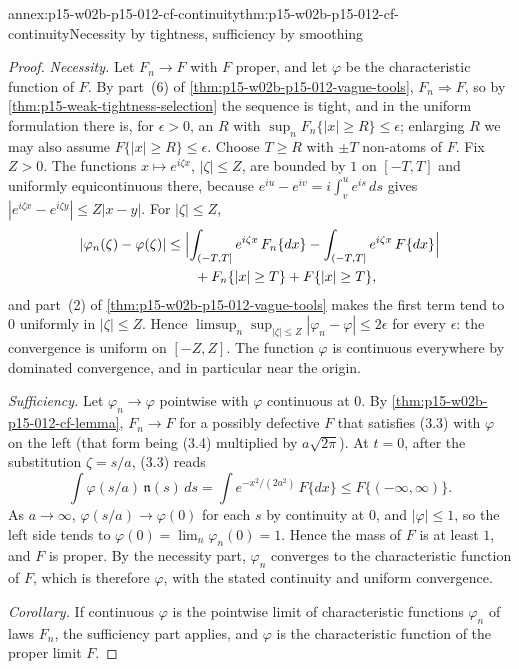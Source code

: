 \begin{annexitem}{annex:p15-w02b-p15-012-cf-continuity}{thm:p15-w02b-p15-012-cf-continuity}{Necessity by tightness, sufficiency by smoothing}
\begin{proof}
\emph{Necessity.} Let \(F_n\to F\) with \(F\) proper, and let \(\varphi\) be
the characteristic function of \(F\). By part~(6) of
\cref{thm:p15-w02b-p15-012-vague-tools}, \(F_n\Rightarrow F\), so by
\cref{thm:p15-weak-tightness-selection} the sequence is tight, and in the
uniform formulation there is, for \(\epsilon>0\), an \(R\) with
\(\sup_nF_n\{|x|\geq R\}\leq\epsilon\); enlarging \(R\) we may also assume
\(F\{|x|\geq R\}\leq\epsilon\). Choose \(T\geq R\) with \(\pm T\) non-atoms of
\(F\). Fix \(Z>0\). The functions \(x\mapsto e^{i\zeta x}\), \(|\zeta|\leq Z\),
are bounded by \(1\) on \([-T,T]\) and uniformly equicontinuous there, because
\(e^{iu}-e^{iv}=i\int_v^ue^{is}\,ds\) gives
\(|e^{i\zeta x}-e^{i\zeta y}|\leq Z|x-y|\). For \(|\zeta|\leq Z\),
\[
 \begin{aligned}
 |\varphi_n(\zeta)-\varphi(\zeta)|
   &\leq\Bigl|\int_{(-T,T]}e^{i\zeta x}\,F_n\{dx\}-\int_{(-T,T]}e^{i\zeta x}\,F\{dx\}\Bigr|\\
   &\qquad+F_n\{|x|\geq T\}+F\{|x|\geq T\},
 \end{aligned}
\]
and part~(2) of \cref{thm:p15-w02b-p15-012-vague-tools} makes the first term
tend to \(0\) uniformly in \(|\zeta|\leq Z\). Hence
\(\limsup_n\sup_{|\zeta|\leq Z}|\varphi_n-\varphi|\leq2\epsilon\) for every
\(\epsilon\): the convergence is uniform on \([-Z,Z]\). The function
\(\varphi\) is continuous everywhere by dominated convergence, and in
particular near the origin.

\emph{Sufficiency.} Let \(\varphi_n\to\varphi\) pointwise with \(\varphi\)
continuous at \(0\). By \cref{thm:p15-w02b-p15-012-cf-lemma}, \(F_n\to F\) for a
possibly defective \(F\) that satisfies (3.3) with \(\varphi\) on the left
(that form being (3.4) multiplied by \(a\sqrt{2\pi}\)). At \(t=0\), after the
substitution \(\zeta=s/a\), (3.3) reads
\[
 \int\varphi(s/a)\,\mathfrak n(s)\,ds=\int e^{-x^2/(2a^2)}\,F\{dx\}
   \leq F\{(-\infty,\infty)\}.
\]
As \(a\to\infty\), \(\varphi(s/a)\to\varphi(0)\) for each \(s\) by continuity at
\(0\), and \(|\varphi|\leq1\), so the left side tends to
\(\varphi(0)=\lim_n\varphi_n(0)=1\). Hence the mass of \(F\) is at least
\(1\), and \(F\) is proper. By the necessity part, \(\varphi_n\) converges to
the characteristic function of \(F\), which is therefore \(\varphi\), with the
stated continuity and uniform convergence.

\emph{Corollary.} If continuous \(\varphi\) is the pointwise limit of
characteristic functions \(\varphi_n\) of laws \(F_n\), the sufficiency part
applies, and \(\varphi\) is the characteristic function of the proper limit
\(F\).
\end{proof}
\end{annexitem}


